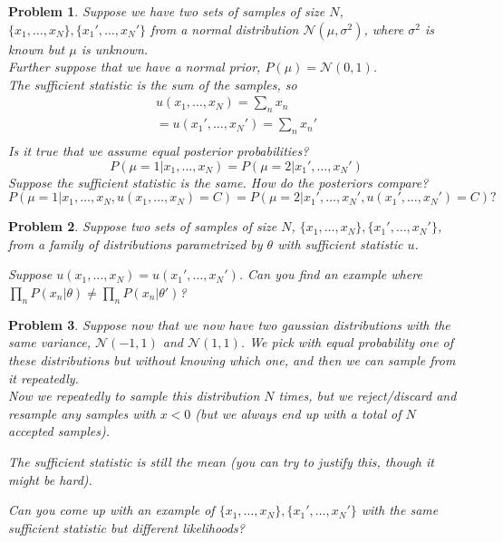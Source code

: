 \documentclass[a4paper]{article}
\newtheorem{problem}{Problem}[section]
\begin{document}
\begin{problem}
  Suppose we have two sets of samples of size $N$, $\{x_1,\ldots,x_N\},\{x_1',\ldots,x_N'\}$ from a normal distribution $\mathcal{N}( \mu, \sigma^2 )$, where $\sigma^2$ is known but $\mu$ is unknown.  \\
  Further suppose that we have a normal prior, $P(\mu) = \mathcal{N}(0,1)$.  \\
  The sufficient statistic is the sum of the samples, so 
\begin{equation}
  \begin{split}
    u(x_1,\ldots,x_N) = \sum_n x_n \\
    = u(x_1',\ldots,x_N') = \sum_n x_n' \\
  \end{split}
  \label{}
\end{equation}
Is it true that we assume equal posterior probabilities?
\begin{equation}
  P( \mu = 1 \vert x_1,\ldots,x_N ) = P( \mu = 2 \vert x_1', \ldots, x_N')
  \label{}
\end{equation}
Suppose the sufficient statistic is the same.  How do the posteriors compare?
\begin{equation}
  P( \mu = 1 \vert x_1,\ldots,x_N, u(x_1,\ldots,x_N) = C ) = P( \mu = 2 \vert x_1',\ldots,x_N', u(x_1',\ldots,x_N') = C ) ?
  \label{}
\end{equation}

\end{problem}

\begin{problem}
Suppose two sets of samples of size $N$, $\{x_1,\ldots,x_N\},\{x_1',\ldots,x_N'\}$, from a family of distributions parametrized by $\theta$ with sufficient statistic $u$.

Suppose $u(x_1,\ldots,x_N) = u(x_1',\ldots,x_N')$.  Can you find an example where $ \prod_n P(x_n \vert \theta) \neq \prod_n P(x_n \vert \theta') $?
\end{problem}

\begin{problem}
  Suppose now that we now have two gaussian distributions with the same variance, $\mathcal{N}(-1,1)$ and $\mathcal{N}(1,1)$.  We pick with equal probability one of these distributions but without knowing which one, and then we can sample from it repeatedly. \\
Now we repeatedly to sample this distribution $N$ times, but we reject/discard and resample any samples with $x<0$ (but we always end up with a total of $N$ accepted samples).

The sufficient statistic is still the mean (you can try to justify this, though it might be hard).

Can you come up with an example of $\{x_1,\ldots,x_N\}, \{x_1',\ldots,x_N'\}$ with the same sufficient statistic but different likelihoods?
\end{problem}
\end{document}
